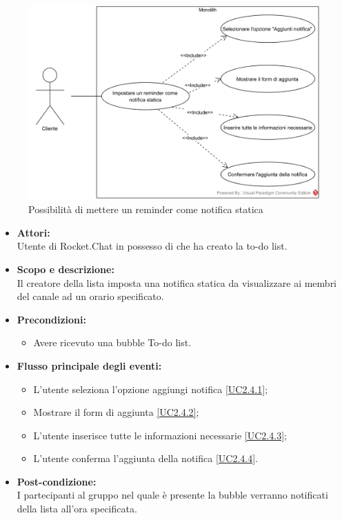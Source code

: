 \begin{figure}[H]
	\centering
	\includegraphics[width=15cm]{../../documenti/AnalisiDeiRequisiti/Diagrammi_img/uc2_4.png}
	\caption{\UCCaption{} Possibilità di mettere un reminder come notifica statica}
\end{figure}

\begin{itemize}
	\item \textbf{Attori:}
	\\Utente di Rocket.Chat in possesso di \ProjectName{} che ha creato la to-do list.
	\item \textbf{Scopo e descrizione:} 
	\\Il creatore della lista imposta una notifica statica da visualizzare ai membri del canale ad un orario specificato.
	\item \textbf{Precondizioni:}
	\begin{itemize}
		\item Avere ricevuto una bubble To-do list.
	\end{itemize}
	\item \textbf{Flusso principale degli eventi:}
	\begin{itemize}
		\item L'utente seleziona l'opzione aggiungi notifica \ref{UC2.4.1};
		\item Mostrare il form di aggiunta \ref{UC2.4.2};
		\item L'utente inserisce tutte le informazioni necessarie \ref{UC2.4.3};
		\item L'utente conferma l'aggiunta della notifica \ref{UC2.4.4}.
	\end{itemize}
	\item \textbf{Post-condizione:}
	\\I partecipanti al gruppo nel quale è presente la bubble verranno notificati della lista all'ora specificata.
\end{itemize}

